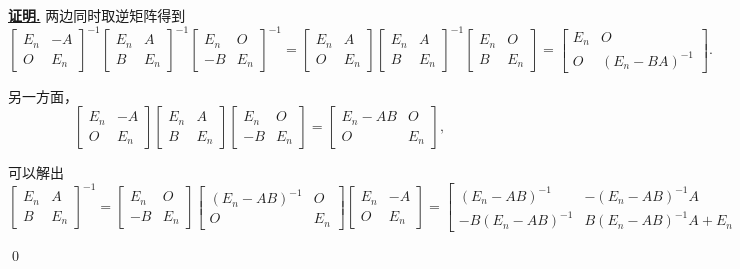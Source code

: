 \documentclass[10pt,openany]{article}
\theoremstyle{thmstyle} %
\theoremstyle{defstyle} %
\theoremstyle{prostyle} %
\theoremstyle{exastyle}
\theoremstyle{remstyle}
\renewenvironment{proof}[1][证明]{\par\underline{\textbf{#1.}} \;\fangsong}{\qed\par}
\begin{document}
\begin{proof}
	两边同时取逆矩阵得到
	\begin{equation}
		\begin{bmatrix}
			E_n & -A \\
			O & E_n
		\end{bmatrix}^{-1}\begin{bmatrix}
			E_n & A \\
			B & E_n
		\end{bmatrix}^{-1}\begin{bmatrix}
			E_n & O \\
			-B & E_n
		\end{bmatrix}^{-1}=\begin{bmatrix}
			E_n & A \\
			O & E_n
		\end{bmatrix}\begin{bmatrix}
			E_n & A \\
			B & E_n
		\end{bmatrix}^{-1}\begin{bmatrix}
			E_n & O \\
			B & E_n
		\end{bmatrix}=\begin{bmatrix}
			E_n & O \\
			O & (E_n-BA)^{-1}
		\end{bmatrix}. 
		\label{equ2.5.1}
	\end{equation}

	
	另一方面，
	\[ \begin{bmatrix}
		E_n & -A \\
		O & E_n
	\end{bmatrix}\begin{bmatrix}
		E_n & A \\
		B & E_n
	\end{bmatrix}\begin{bmatrix}
		E_n & O \\
		-B & E_n
	\end{bmatrix}=\begin{bmatrix}
		E_n-AB & O \\
		O & E_n
	\end{bmatrix}, \]
	
	可以解出
	\[ \begin{bmatrix}
		E_n & A \\
		B & E_n
	\end{bmatrix}^{-1}=\begin{bmatrix}
	E_n & O \\
	-B & E_n
	\end{bmatrix}\begin{bmatrix}
	(E_n-AB)^{-1} & O \\
	O & E_n
	\end{bmatrix}\begin{bmatrix}
	E_n & -A \\
	O & E_n
	\end{bmatrix}=\begin{bmatrix}
	(E_n-AB)^{-1} & -(E_n-AB)^{-1}A \\
	-B(E_n-AB)^{-1}  & B(E_n-AB)^{-1}A+E_n
\end{bmatrix}. \]


\end{proof}
\end{document}
